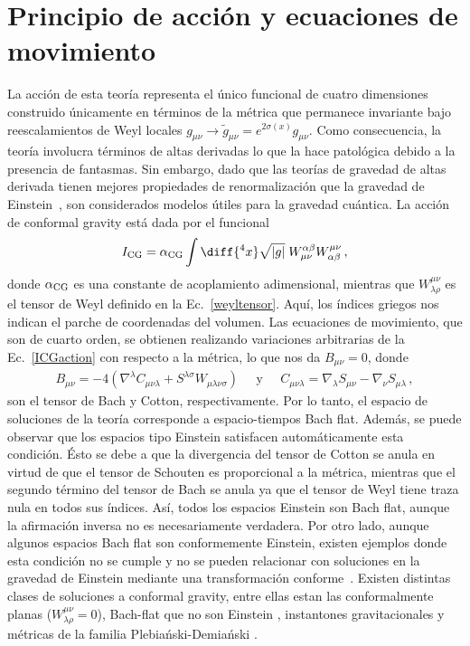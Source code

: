\documentclass[../Main.tex]{subfiles}
\begin{document}
\section{Principio de acción y ecuaciones de movimiento}
La acción de esta teoría representa el único funcional de cuatro dimensiones construido únicamente en términos de la métrica que permanece invariante bajo reescalamientos de Weyl locales $g_{\mu\nu}\to\tilde{g}_{\mu\nu} = e^{2\sigma(x)}g_{\mu\nu}$. Como consecuencia, la teoría involucra términos de altas derivadas lo que la hace patológica debido a la presencia de fantasmas. Sin embargo, dado que las teorías de gravedad de altas derivada tienen mejores propiedades de renormalización que la gravedad de Einstein~\cite{Capper:1975ig,Stelle:1976gc,Julve:1978xn,Fradkin:1981iu}, son considerados modelos útiles para la gravedad cuántica. La acción de conformal gravity está dada por el funcional
\begin{equation}
I_{\rm CG} = \alpha_{\rm CG} \int\diff{^4x}\sqrt{|g|} \;W^{\alpha \beta}_{\mu \nu} W^{\mu \nu}_{\alpha \beta} \,,
\label{ICGaction}
\end{equation}
donde $\alpha_{\rm CG}$ es una constante de acoplamiento adimensional, mientras que $W^{\mu\nu}_{\lambda\rho}$ es el tensor de Weyl definido en la Ec.~\eqref{weyltensor}. 
Aquí, los índices griegos nos indican el parche de coordenadas del volumen. Las ecuaciones de movimiento, que son de cuarto orden, se obtienen realizando variaciones arbitrarias de la Ec.~\eqref{ICGaction} con respecto a la métrica, lo que nos da $B_{\mu\nu}=0$, donde
\begin{align}
B_{\mu \nu} = -4 \left(\nabla^{\lambda} C_{\mu \nu \lambda} + S^{\lambda \sigma} W_{\mu \lambda \nu \sigma } \right)\;\;\;\;\; \mbox{y} \;\;\;\;\;
C_{\mu \nu \lambda} = \nabla_{\lambda} S_{\mu \nu} - \nabla_{\nu} S_{\mu \lambda} \,, 
\end{align}
son el tensor de Bach y Cotton, respectivamente. Por lo tanto, el espacio de soluciones de la teoría corresponde a espacio-tiempos Bach flat. Además, se puede observar que los espacios tipo Einstein satisfacen automáticamente esta condición. Ésto se debe a que la divergencia del tensor de Cotton se anula en virtud de que el tensor de Schouten es proporcional a la métrica, mientras que el segundo término del tensor de Bach se anula ya que el tensor de Weyl tiene traza nula en todos sus índices. Así, todos los espacios Einstein son Bach flat, aunque la afirmación inversa no es necesariamente verdadera. Por otro lado, aunque algunos espacios Bach flat  son conformemente Einstein, existen ejemplos donde esta condición no se cumple y no se pueden relacionar con soluciones en la gravedad de Einstein mediante una transformación conforme~\cite{Liu:2013fna,Dunajski:2013zta}. Existen distintas clases de soluciones a conformal gravity, entre ellas estan las conformalmente planas ($W^{\mu\nu}_{\lambda\rho}=0$), Bach-flat que no son Einstein \cite{Riegert:1984zz}, instantones gravitacionales \cite{Corral:2021xsu} y métricas de la familia Plebia\'nski-Demia\'nski \cite{Cisterna_2021}.
\end{document}
